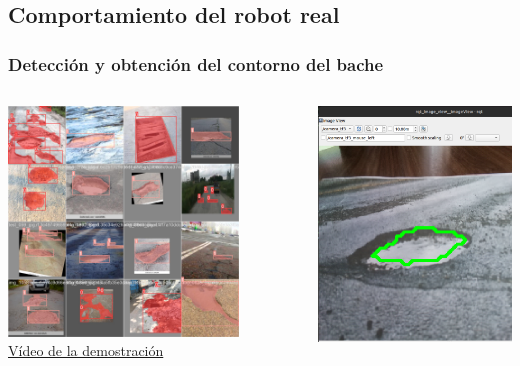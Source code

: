 \documentclass{beamer}
\begin{document}
\subsection{Comportamiento del robot real}
\begin{frame}
	\frametitle{Detección y obtención del contorno del bache}
	\centering
	\begin{columns}
		\begin{column}{0.60\textwidth}
			\centering
			\includegraphics[width=0.8\textwidth]{figs/train_results.jpg} \\[5pt]
			\href{https://www.youtube.com/watch?v=Gnwciv4pWf0}{Vídeo de la demostración}
		\end{column}
		\begin{column}{0.4\textwidth}
			\centering
			\includegraphics[height=0.7\textwidth]{figs/contornobache1.png} \\[10pt]

\end{column}
\end{columns}
\end{frame}
\end{document}
